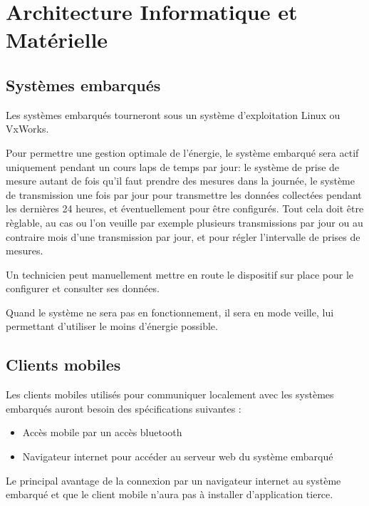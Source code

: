 \section{Architecture Informatique et Matérielle}

\subsection{Systèmes embarqués}

Les systèmes embarqués tourneront sous un système d'exploitation Linux ou VxWorks. 

Pour permettre une gestion optimale de l'énergie, le système embarqué sera actif
uniquement pendant un cours laps de temps par jour: le système de prise de mesure
autant de fois qu'il faut prendre des mesures dans la journée, le système de
transmission une fois par jour pour transmettre les données collectées pendant
les dernières 24 heures, et éventuellement pour être configurés.
Tout cela doit être règlable, au cas ou l'on veuille par exemple plusieurs transmissions
par jour ou au contraire mois d'une transmission par jour, et pour régler l'intervalle de
prises de mesures.

Un technicien peut manuellement mettre en route le dispositif sur place pour
le configurer et consulter ses données.

Quand le système ne sera pas en fonctionnement, il sera en mode veille, lui
permettant d'utiliser le moins d'énergie possible.



\subsection{Clients mobiles}

Les clients mobiles utilisés pour communiquer localement avec les systèmes embarqués auront besoin des spécifications suivantes : 
\begin{itemize}
\item Accès mobile par un accès bluetooth
\item Navigateur internet pour accéder au serveur web du système embarqué
\end{itemize}
Le principal avantage de la connexion par un navigateur internet au système embarqué et que le client mobile n'aura pas à installer d'application tierce.

